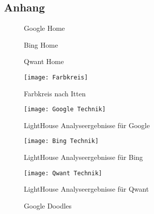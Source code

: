 \begin{appendix}
  \section{Anhang}\label{sec:anhang}

  \begin{figure}[ht]
    \centering
    \caption{Google Home}\label{fig:google_home}
  \end{figure}
  \begin{figure}[ht]
    \centering
    \caption{Bing Home}\label{fig:bing_home}
  \end{figure}
  \begin{figure}[ht]
    \centering
    \caption{Qwant Home}\label{fig:qwant_home}
  \end{figure}

  \begin{figure}[ht]
    \centering
    \texttt{[image: Farbkreis]}
    \caption{Farbkreis nach Itten\autocite{Farbkreis}}
    \label{fig:farbkreis}
  \end{figure}

  \begin{figure}[ht]
    \centering
    \texttt{[image: Google Technik]}
    \caption{LightHouse Analyseergebnisse für Google}\label{fig:figure7}
  \end{figure}
  \begin{figure}[ht]
    \centering
    \texttt{[image: Bing Technik]}
    \caption{LightHouse Analyseergebnisse für Bing}\label{fig:figure10}
  \end{figure}
  \begin{figure}[ht]
    \centering
    \texttt{[image: Qwant Technik]}
    \caption{LightHouse Analyseergebnisse für Qwant}\label{fig:figure11}
  \end{figure}

  \begin{figure}[ht]
    \centering
    \caption{Google Doodles}\label{fig:google_doodle}
  \end{figure}
\end{appendix}